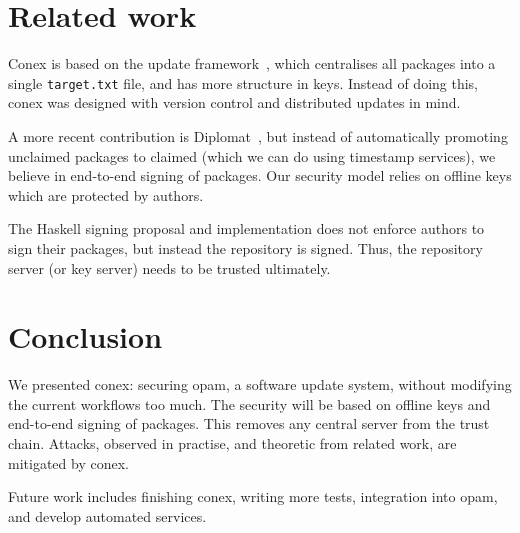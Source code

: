 \documentclass[nocopyrightspace]{sigplanconf}
\begin{document}
\section{Related work} \label{sec:related}
Conex is based on the update framework~\cite{tuf}, which centralises all packages into a single \texttt{target.txt} file, and has more structure in keys.
Instead of doing this, conex was designed with version control and distributed updates in mind.

A more recent contribution is Diplomat~\cite{diplomat}, but instead of automatically promoting unclaimed packages to claimed (which we can do using timestamp services), we believe in end-to-end signing of packages.
Our security model relies on offline keys which are protected by authors.

The Haskell signing proposal and implementation does not enforce authors to sign their packages, but instead the repository is signed.
Thus, the repository server (or key server) needs to be trusted ultimately.

\section{Conclusion} \label{sec:conclusion}
We presented conex: securing opam, a software update system, without modifying the current workflows too much.
The security will be based on offline keys and end-to-end signing of packages.
This removes any central server from the trust chain.
Attacks, observed in practise, and theoretic from related work, are mitigated by conex.

Future work includes finishing conex, writing more tests, integration into opam, and develop automated services.



\end{document}

